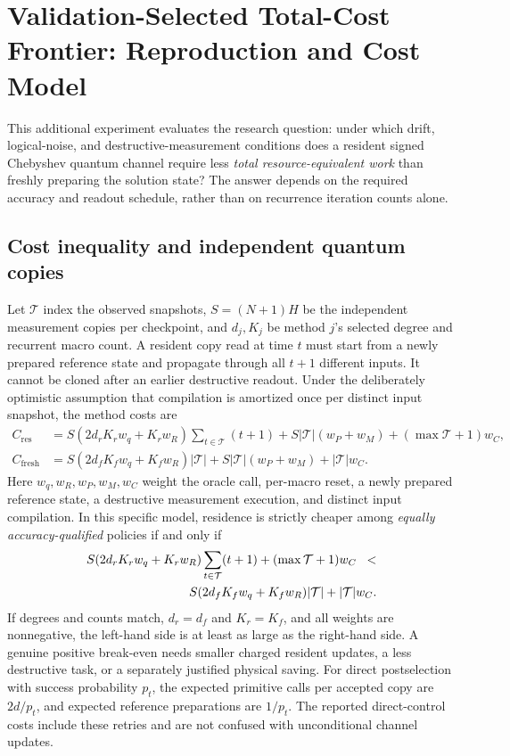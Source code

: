\documentclass[10pt]{article}
\begin{document}
\section{Validation-Selected Total-Cost Frontier: Reproduction and Cost Model}
\label{sec:costfrontierappendix}
This additional experiment evaluates the research question: under which drift,
logical-noise, and destructive-measurement conditions does a resident signed
Chebyshev quantum channel require less \emph{total resource-equivalent work}
than freshly preparing the solution state? The answer depends on the required
accuracy and readout schedule, rather than on recurrence iteration counts alone.

\subsection{Cost inequality and independent quantum copies}
Let $\mathcal{T}$ index the observed snapshots, $S=(N+1)H$ be the independent
measurement copies per checkpoint, and $d_j,K_j$ be method $j$'s selected
degree and recurrent macro count. A resident copy read at time $t$ must start
from a newly prepared reference state and propagate through all $t+1$
different inputs. It cannot be cloned after an earlier destructive readout.
Under the deliberately optimistic assumption that compilation is amortized
once per distinct input snapshot, the method costs are
\begin{align}
C_{\mathrm{res}}&=S(2d_rK_rw_q+K_rw_R)
\sum_{t\in\mathcal{T}}(t+1)
+S|\mathcal{T}|(w_P+w_M)
+(\max\mathcal{T}+1)w_C,\label{eq:cost_res_supp}\\
C_{\mathrm{fresh}}&=S(2d_fK_fw_q+K_fw_R)
|\mathcal{T}|+
S|\mathcal{T}|(w_P+w_M)
+|\mathcal{T}|w_C.\label{eq:cost_fresh_supp}
\end{align}
Here $w_q,w_R,w_P,w_M,w_C$ weight the oracle call, per-macro reset, a newly
prepared reference state, a destructive measurement execution, and distinct
input compilation. In this specific model, residence is strictly cheaper
among \emph{equally accuracy-qualified} policies if and only if
\begin{align}
S(2d_rK_rw_q+K_rw_R)\sum_{t\in\mathcal{T}}(t+1)
+(\max\mathcal{T}+1)w_C\;\;<\notag\\
S(2d_fK_fw_q+K_fw_R)|\mathcal{T}|+|\mathcal{T}|w_C.\label{eq:cost_break_even_supp}
\end{align}
If degrees and counts match, $d_r=d_f$ and $K_r=K_f$, and all weights are
nonnegative, the left-hand side is at least as large as the right-hand side.
A genuine positive break-even needs smaller charged resident updates,
a less destructive task, or a separately justified physical saving.
For direct postselection with success probability $p_t$, the expected
primitive calls per accepted copy are $2d/p_t$, and expected reference
preparations are $1/p_t$. The reported direct-control costs include these
retries and are not confused with unconditional channel updates.
\end{document}
